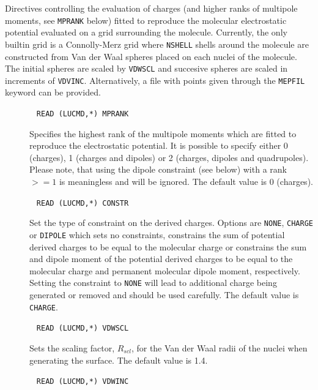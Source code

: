 Directives controlling the evaluation of charges (and higher ranks of multipole moments, see \verb|MPRANK| below) fitted to reproduce the molecular electrostatic potential evaluated on a grid surrounding the molecule. Currently, the only builtin grid is a Connolly-Merz grid where \verb|NSHELL| shells around the molecule are constructed from Van der Waal spheres placed on each nuclei of the molecule. The initial spheres are scaled by \verb|VDWSCL| and succesive spheres are scaled in increments of \verb|VDVINC|. Alternatively, a file with points given through the \verb|MEPFIL| keyword can be provided.

\begin{description}
\item[]\verb| |\newline
\verb|READ (LUCMD,*) MPRANK|

Specifies the highest rank of the multipole moments which are fitted to reproduce the electrostatic potential. It is possible to specify either 0 (charges), 1 (charges and dipoles) or 2 (charges, dipoles and quadrupoles). Please note, that using the dipole constraint (see below) with a rank $>=1$ is meaningless and will be ignored. The default value is 0 (charges).

\item[]\verb| |\newline
\verb|READ (LUCMD,*) CONSTR|

Set the type of constraint on the derived charges. Options are \verb|NONE|, \verb|CHARGE| or \verb|DIPOLE| which sets no constraints, constrains the sum of potential derived charges to be equal to the molecular charge or constrains the sum and dipole moment of the potential derived charges to be equal to the molecular charge and permanent molecular dipole moment, respectively. Setting the constraint to \verb|NONE| will lead to additional charge being generated or removed and should be used carefully. The default value is \verb|CHARGE|.

\item[]\verb| |\newline
\verb|READ (LUCMD,*) VDWSCL|

Sets the scaling factor, $R_{scl}$, for the Van der Waal radii of the nuclei when generating the surface. The default value is 1.4.

\item[]\verb| |\newline
\verb|READ (LUCMD,*) VDWINC|


\end{description}
